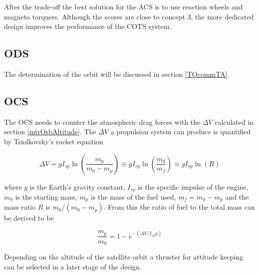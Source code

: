 After the trade-off the best solution for the \ac{ACS} is to use reaction wheels and magneto torquers. Although the scores are close to concept 3, the more dedicated design improves the performance of the \ac{COTS} system.

\subsection{\ac{ODS}}
\label{ss:ods}
The determination of the orbit will be discussed in section \ref{TOcommTA}.

\subsection{\ac{OCS}}
\label{ss:ocs}

The \ac{OCS} needs to counter the atmospheric drag forces with the $\Delta V$ calculated in section \ref{mtrOrbAltitude}. The $\Delta V$ a propulsion system can produce is quantified by Tsiolkovsky's rocket equation

\begin{equation}
\Delta V = g I_{sp} \ln{\left(\frac{m_0}{m_0-m_p}\right)}\equiv g I_{sp} \ln{\left(\frac{m_0}{m_f}\right)} \equiv g I_{sp} \ln{\left(R\right)}
\label{eqn:tsiolkovsky}
\end{equation}

where $g$ is the Earth's gravity constant, $I_{sp}$ is the specific impulse of the engine, $m_0$ is the starting mass, $m_p$ is the mass of the fuel used, $m_f = m_0-m_p$ and the mass ratio $R$ is  ${m_0}/\left({m_0-m_p}\right)$. From this the ratio of fuel to the total mass can be derived to be

\begin{equation}
\frac{m_p}{m_0} = 1-e^{-\left(\Delta V/I_{sp}g\right)}
\label{eqn:fuelratio}
\end{equation}

Depending on the altitude of the satellite orbit a thruster for attitude keeping can be selected in a later stage of the design.
